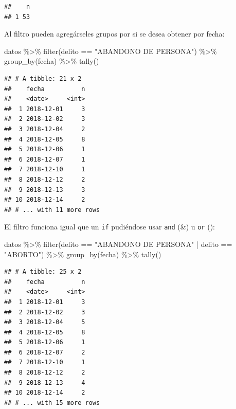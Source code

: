 \documentclass[
]{book}
\newenvironment{Shaded}{\begin{snugshade}}{\end{snugshade}}
\newcommand{\FunctionTok}[1]{\textcolor[rgb]{0.00,0.00,0.00}{#1}}
\newcommand{\NormalTok}[1]{#1}
\newcommand{\SpecialCharTok}[1]{\textcolor[rgb]{0.00,0.00,0.00}{#1}}
\newcommand{\StringTok}[1]{\textcolor[rgb]{0.31,0.60,0.02}{#1}}
\begin{document}
\begin{verbatim}
##    n
## 1 53
\end{verbatim}

Al filtro pueden agregárseles grupos por si se desea obtener por fecha:

\begin{Shaded}
\begin{Highlighting}[]
\NormalTok{datos }\SpecialCharTok{\%\textgreater{}\%} \FunctionTok{filter}\NormalTok{(delito }\SpecialCharTok{==} \StringTok{"ABANDONO DE PERSONA"}\NormalTok{) }\SpecialCharTok{\%\textgreater{}\%} 
  \FunctionTok{group\_by}\NormalTok{(fecha) }\SpecialCharTok{\%\textgreater{}\%}  \FunctionTok{tally}\NormalTok{()}
\end{Highlighting}
\end{Shaded}

\begin{verbatim}
## # A tibble: 21 x 2
##    fecha          n
##    <date>     <int>
##  1 2018-12-01     3
##  2 2018-12-02     3
##  3 2018-12-04     2
##  4 2018-12-05     8
##  5 2018-12-06     1
##  6 2018-12-07     1
##  7 2018-12-10     1
##  8 2018-12-12     2
##  9 2018-12-13     3
## 10 2018-12-14     2
## # ... with 11 more rows
\end{verbatim}

El filtro funciona igual que un \texttt{if} pudiéndose usar \texttt{and} (\&) u \texttt{or} (\textbar):

\begin{Shaded}
\begin{Highlighting}[]
\NormalTok{datos }\SpecialCharTok{\%\textgreater{}\%} 
  \FunctionTok{filter}\NormalTok{(delito }\SpecialCharTok{==} \StringTok{"ABANDONO DE PERSONA"} \SpecialCharTok{|}\NormalTok{  delito }\SpecialCharTok{==} \StringTok{"ABORTO"}\NormalTok{) }\SpecialCharTok{\%\textgreater{}\%} 
  \FunctionTok{group\_by}\NormalTok{(fecha) }\SpecialCharTok{\%\textgreater{}\%}  \FunctionTok{tally}\NormalTok{()}
\end{Highlighting}
\end{Shaded}

\begin{verbatim}
## # A tibble: 25 x 2
##    fecha          n
##    <date>     <int>
##  1 2018-12-01     3
##  2 2018-12-02     3
##  3 2018-12-04     5
##  4 2018-12-05     8
##  5 2018-12-06     1
##  6 2018-12-07     2
##  7 2018-12-10     1
##  8 2018-12-12     2
##  9 2018-12-13     4
## 10 2018-12-14     2
## # ... with 15 more rows
\end{verbatim}
\end{document}
